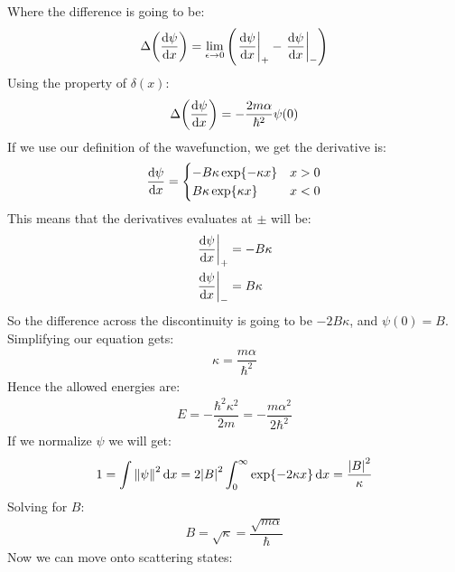 Where the difference is going to be:
\begin{align*}
  \Delta\qty(\dv{\psi}{x})=
  \lim_{\epsilon\to 0}\qty(\eval{\dv{\psi}{x}}_+-\eval{\dv{\psi}{x}}_-)
\end{align*}
Using the property of $\delta(x)$:
\begin{align*}
  \Delta\qty(\dv{\psi}{x})=-\dfrac{2m\alpha}{\hbar^2}\psi(0)
\end{align*}
If we use our definition of the wavefunction, we get the derivative is:
\begin{align*}
  \dv{\psi}{x}=
  \begin{cases}
    -B\kappa\exp{-\kappa x} & x > 0 \\
    B\kappa\exp{\kappa x} & x < 0 
  \end{cases}
\end{align*}
This means that the derivatives evaluates at $\pm$ will be:
\begin{align*}
  \eval{\dv{\psi}{x}}_+&=-B\kappa \\
  \eval{\dv{\psi}{x}}_-&=B\kappa
\end{align*}
So the difference across the discontinuity is going to be $-2B\kappa$, and $\psi(0)=B$. Simplifying our equation gets:
\begin{align*}
  \kappa =\dfrac{m\alpha}{\hbar^2}
\end{align*}
Hence the allowed energies are:
\begin{align*}
  E=-\dfrac{\hbar^2\kappa^2}{2m}=-\dfrac{m\alpha^2}{2\hbar^2}
\end{align*}
If we normalize $\psi$ we will get:
\begin{align*}
  1=\int\norm{\psi}^2\dd{x}=2\abs{B}^2\int_0^{\infty}\exp{-2\kappa x}\dd{x}=
  \dfrac{\abs{B}^2}{\kappa}
\end{align*}
Solving for $B$:
\begin{align*}
  B=\sqrt{\kappa}=\dfrac{\sqrt{m\alpha}}{\hbar}
\end{align*}
Now we can move onto scattering states:
